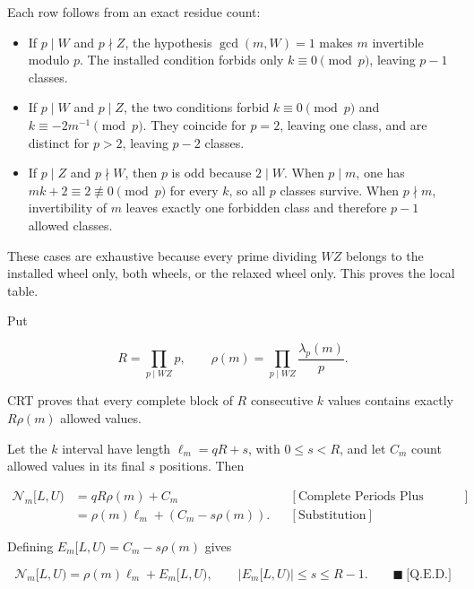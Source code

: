 Each row follows from an exact residue count:

\begin{itemize}
\item If $p\mid W$ and $p\nmid Z$, the hypothesis $\gcd(m,W)=1$ makes $m$
  invertible modulo $p$. The installed condition forbids only
  $k\equiv0\pmod p$, leaving $p-1$ classes.
\item If $p\mid W$ and $p\mid Z$, the two conditions forbid
  $k\equiv0\pmod p$ and $k\equiv-2m^{-1}\pmod p$. They coincide for $p=2$,
  leaving one class, and are distinct for $p>2$, leaving $p-2$ classes.
\item If $p\mid Z$ and $p\nmid W$, then $p$ is odd because $2\mid W$. When
  $p\mid m$, one has $mk+2\equiv2\not\equiv0\pmod p$ for every $k$, so all
  $p$ classes survive. When $p\nmid m$, invertibility of $m$ leaves exactly
  one forbidden class and therefore $p-1$ allowed classes.
\end{itemize}

These cases are exhaustive because every prime dividing $WZ$ belongs to the
installed wheel only, both wheels, or the relaxed wheel only. This proves the
local table.

Put

\begin{equation*}
R=\prod_{p\mid WZ}p,
\qquad
\rho(m)=\prod_{p\mid WZ}\frac{\lambda_p(m)}p.
\end{equation*}

CRT proves that every complete block of $R$ consecutive $k$ values contains
exactly $R\rho(m)$ allowed values.

Let the $k$ interval have length $\ell_m=qR+s$, with $0\le s\lt R$, and let
$C_m$ count allowed values in its final $s$ positions. Then

\begin{equation*}
\begin{aligned}
\mathcal N_m[L,U)
&=qR\rho(m)+C_m
&&[\text{Complete Periods Plus Remainder}]\\
&=\rho(m)\ell_m+
\left(C_m-s\rho(m)\right).
&&[\text{Substitution}]
\end{aligned}
\end{equation*}

Defining $E_m[L,U)=C_m-s\rho(m)$ gives

\begin{equation*}
\mathcal N_m[L,U)
=\rho(m)\ell_m+E_m[L,U),
\qquad
|E_m[L,U)|\le s\le R-1.
\qquad\blacksquare\ \text{[Q.E.D.]}
\end{equation*}

